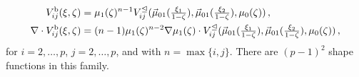 \begin{equation}
	\begin{aligned}
		V_{ij}^{\mathrm{b}}(\xi,\zeta)&=\mu_1(\zeta)^{n-1}V_{ij}^\trianglelefteq(\vec{\mu}_{01}(\textstyle{\frac{\xi_1}{1-\zeta}}),\vec{\mu}_{01}(\textstyle{\frac{\xi_2}{1-\zeta}}),\mu_0(\zeta))\,,\\
		\nabla\cdot	V_{ij}^{\mathrm{b}}(\xi,\zeta)&=(n-1)\mu_1(\zeta)^{n-2}\nabla\mu_1(\zeta)
			\cdot V_{ij}^\trianglelefteq(\vec{\mu}_{01}(\textstyle{\frac{\xi_1}{1-\zeta}}),\vec{\mu}_{01}(\textstyle{\frac{\xi_2}{1-\zeta}}),\mu_0(\zeta))\,,
	\end{aligned}
	\label{eq:PyrHdivInteriorV}
\end{equation}
for $i=2,\ldots,p$, $j=2,\ldots,p$, and with $n=\max\{i,j\}$. 
There are $(p-1)^2$ shape functions in this family.

